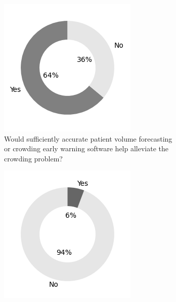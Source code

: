 \documentclass{article}
\begin{document}
\begin{figure}[H]
    \centering
    \begin{subfigure}[b]{0.45\textwidth}
        \includegraphics[width=\textwidth]{../output/plots/benefit}
        \caption{Would sufficiently accurate patient volume forecasting or crowding early warning software help alleviate the crowding problem?}
        \label{fig:benefit}
    \end{subfigure}
    \begin{subfigure}[b]{0.45\textwidth}
        \includegraphics[width=\textwidth]{../output/plots/software_usage}

\end{subfigure}
\end{figure}
\end{document}

